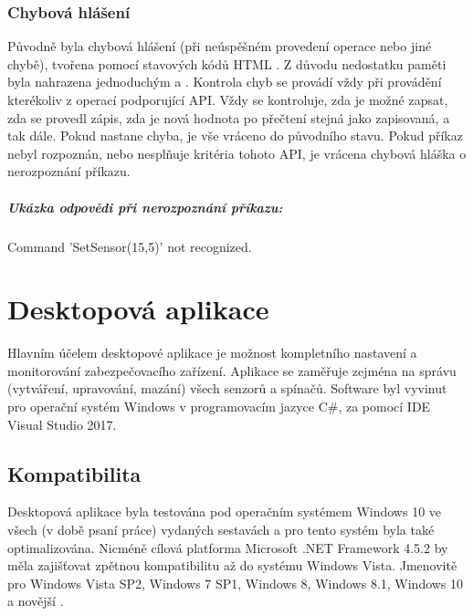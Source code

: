 \documentclass[FM,DP]{tulthesis}  %
\begin{document}
\subsection{Chybová hlášení}
Původně byla chybová hlášení (při neúspěšném provedení operace nebo jiné chybě), tvořena pomocí stavových kódů HTML \cite{HTML1.1}. Z důvodu nedostatku paměti byla nahrazena jednoduchým  a . Kontrola chyb se provádí vždy při provádění kterékoliv z operací podporující API. Vždy se kontroluje, zda je možné zapsat, zda se provedl zápis, zda je nová hodnota po přečtení stejná jako zapisovaná, a tak dále. Pokud nastane chyba, je vše vráceno do původního stavu. Pokud příkaz nebyl rozpoznán, nebo nesplňuje kritéria tohoto API, je vrácena chybová hláška o nerozpoznání příkazu.
\paragraph{Ukázka odpovědi při nerozpoznání příkazu:}
\begin{center}
Command 'SetSensor(15,5)' not recognized.
\end{center} 


\chapter{Desktopová aplikace}
Hlavním účelem desktopové aplikace je možnost kompletního nastavení a monitorování zabezpečovacího zařízení. Aplikace se zaměřuje zejména na správu (vytváření, upravování, mazání) všech senzorů a spínačů. Software byl vyvinut pro operační systém Windows v programovacím jazyce C\#, za pomocí IDE Visual Studio 2017.

\section{Kompatibilita}
Desktopová aplikace byla testována pod operačním systémem Windows 10 ve všech (v době psaní práce) vydaných sestavách a pro tento systém byla také optimalizována. Nicméně cílová platforma Microsoft .NET Framework 4.5.2 \cite{WhatsNew.NetFramework4.5.2} by měla zajišťovat zpětnou kompatibilitu až do systému Windows Vista. Jmenovitě pro Windows Vista SP2, Windows 7 SP1, Windows 8, Windows 8.1, Windows 10 a novější \cite{.NetFramework4.5.2}.
\end{document}
